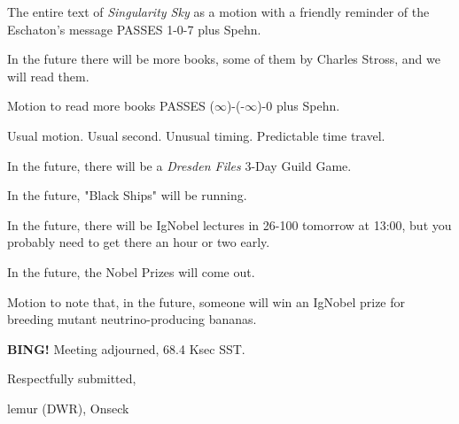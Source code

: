 \documentclass[10pt]{article}
\newcommand{\bing}{{\bf BING!} }
\newcommand{\ps}{ plus Spehn\xspace}
\newcommand{\onseck}{lemur (DWR), Onseck}
\begin{document}
The entire text of \emph{Singularity Sky} as a motion with a friendly
reminder of the Eschaton's message PASSES 1-0-7\ps.

In the future there will be more books, some of them by Charles Stross,
and we will read them.

Motion to read more books PASSES ($\infty$)-(-$\infty$)-0\ps.

Usual motion.  Usual second.  Unusual timing.  Predictable time travel.

In the future, there will be a \emph{Dresden Files} 3-Day Guild Game.

In the future, "Black Ships" will be running.

In the future, there will be IgNobel lectures in 26-100 tomorrow at 13:00,
but you probably need to get there an hour or two early.

In the future, the Nobel Prizes will come out.

Motion to note that, in the future, someone will win an IgNobel prize 
for breeding mutant neutrino-producing bananas.


\bing
\noindent
Meeting adjourned, 68.4 Ksec SST.

\vspace{18pt}

\centerline{Respectfully submitted,}
\centerline{\onseck}
\end{document}
